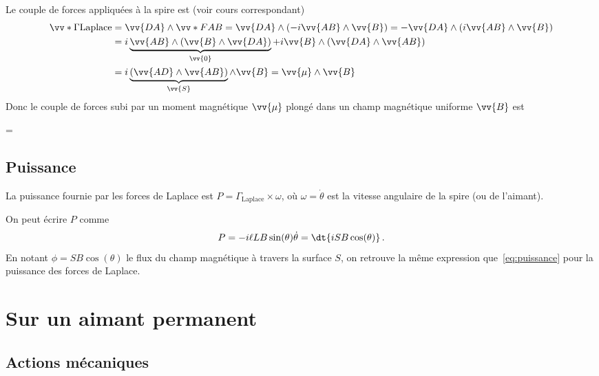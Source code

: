 \documentclass{cours}
\begin{document}
Le couple de forces appliquées à la spire est (voir cours correspondant)
\begin{align}
  \vv*{\Gamma}{\text{Laplace}} &=\vv{DA}\wedge \vv*{F}{AB} = \vv{DA} \wedge \left( -i\vv{AB} \wedge \vv{B} \right)  = -\vv{DA} \wedge \left( i\vv{AB} \wedge \vv{B} \right) \\
  &=i\underbrace{\vv{AB} \wedge \left( \vv{B} \wedge \vv{DA} \right)}_{\vv{0}} + i\vv{B}\wedge \left( \vv{DA}\wedge \vv{AB} \right)\\
  &=i\underbrace{\left( \vv{AD} \wedge \vv{AB} \right)}_{\vv{S}} \wedge\vv{B} = \vv{\mu} \wedge \vv{B}
\end{align}
Donc le couple de forces subi par un moment magnétique $\vv{\mu}$ plongé dans un champ magnétique uniforme $\vv{B}$ est 
\begin{eqencadre}
  \vv{\Gamma} = \vv{\mu} \wedge {}
\end{eqencadre}

\subsection{Puissance}%
\label{sub:puissance}
La puissance fournie par les forces de Laplace est $P=\Gamma_\text{Laplace}\times \omega $, où $\omega=\dot{\theta}$ est la vitesse angulaire de la spire (ou de l'aimant). 

On peut écrire $P$ comme
\begin{equation}
  P = -i\ell L B \sin(\theta) \dot{\theta} = \dt{iSB\cos(\theta)}\, .
\end{equation}
En notant $\phi=SB\cos(\theta)$ le flux du champ magnétique à travers la surface $S$, on retrouve la même expression que~\ref{eq:puissance} pour la puissance des forces de Laplace.  

\section{Sur un aimant permanent}%
\label{sec:sur_un_aimant_permanent}

\subsection{Actions mécaniques}%
\label{sub:actions_mecaniques}
\end{document}
